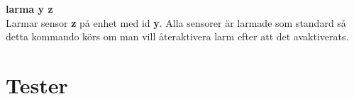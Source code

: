 \documentclass{article}
\begin{document}
    \textbf{larma y z} \\
    Larmar sensor \textbf{z} på enhet med id \textbf{y}. Alla sensorer är larmade som standard så detta kommando körs om man vill återaktivera larm efter att det avaktiverats.

	\clearpage
	\section{Tester}
    		\label{bilaga:tester}
     	
	
	
	
         
         
         
         
         
         
	
\end{document}
